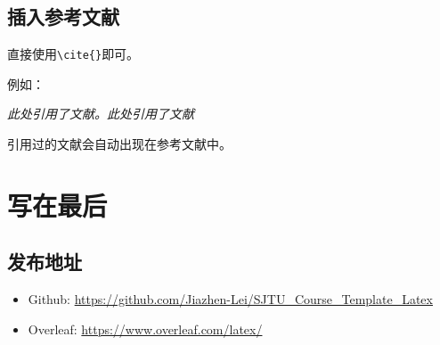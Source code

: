 \documentclass[12pt,hyperref,a4paper,UTF8]{ctexart}
\begin{document}
%
%
%
%
%
%

\subsection{插入参考文献}
直接使用\verb|\cite{}|即可。

例如：


   \textit{ 此处引用了文献\cite{OFDMAbackscatter}。此处引用了文献\cite{DigiScatter}}


引用过的文献会自动出现在参考文献中。

\section{写在最后}
\subsection{发布地址}
\begin{itemize}
    \item Github: \url{https://github.com/Jiazhen-Lei/SJTU_Course_Template_Latex}
    \item Overleaf:  \url{https://www.overleaf.com/latex/}
\end{itemize}


\end{document}
